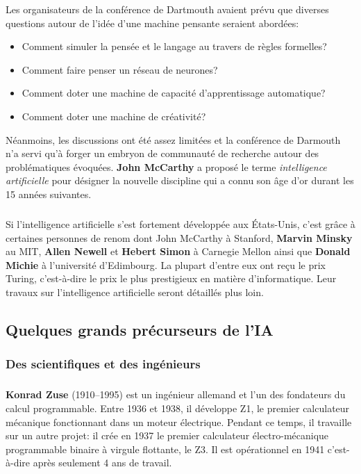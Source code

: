 Les organisateurs de la conférence de Dartmouth avaient prévu que diverses questions autour de l'idée d'une machine pensante seraient abordées:
\begin{itemize}
\item Comment simuler la pensée et le langage au travers de règles formelles?
\item Comment faire penser un réseau de neurones?
\item Comment doter une machine de capacité d'apprentissage automatique?
\item Comment doter une machine de créativité?
\end{itemize}
Néanmoins, les discussions ont été assez limitées et la conférence de Darmouth n'a servi qu'à forger un embryon de communauté de recherche autour des problématiques évoquées.
\textbf{John McCarthy} a proposé le terme \textit{intelligence artificielle} pour désigner la nouvelle discipline qui a connu son âge d'or durant les 15 années suivantes.

\subparagraph{}
Si l'intelligence artificielle s’est fortement développée aux États-Unis, c'est grâce à certaines personnes de renom dont John McCarthy à Stanford, \textbf{Marvin Minsky} au MIT, \textbf{Allen Newell} et \textbf{Hebert Simon} à Carnegie Mellon ainsi que \textbf{Donald Michie} à l’université d’Edimbourg. La plupart d’entre eux ont reçu le prix Turing, c'est-à-dire le prix le plus prestigieux en matière d'informatique. 
Leur travaux sur l'intelligence artificielle seront détaillés plus loin.




\subsection{Quelques grands précurseurs de l'IA}

\subsubsection{Des scientifiques et des ingénieurs}


\subparagraph{}
\textbf{Konrad Zuse} (1910–1995) est un ingénieur allemand et l’un des fondateurs du calcul programmable. Entre  1936 et 1938, il développe Z1, le premier calculateur mécanique fonctionnant dans un moteur électrique. Pendant ce temps, il travaille sur un autre projet: il crée en 1937 le premier calculateur électro-mécanique programmable binaire à virgule flottante, le Z3. Il est opérationnel en 1941 c'est-à-dire après seulement 4 ans de travail.


